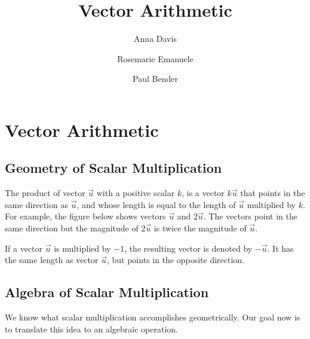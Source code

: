 \documentclass{ximera}
\author{Anna Davis \and Rosemarie Emanuele \and Paul Bender} \title{Vector Arithmetic} \license{CC-BY 4.0}
\begin{document}
\begin{abstract}
 
\end{abstract}
\maketitle

\section*{Vector Arithmetic}

\subsection*{Geometry of Scalar Multiplication} The product of vector $\vec{u}$ with a positive scalar $k$, is a vector $k\vec{u}$ that points in the same direction as $\vec{u}$, and whose length  is equal to the length of $\vec{u}$ multiplied by $k$. For example, the figure below shows vectors $\vec{u}$ and $2\vec{u}$.  The vectors point in the same direction but the magnitude of $2\vec{u}$ is twice the magnitude of $\vec{u}$.

\begin{center}
\end{center}


If a vector $\vec{u}$ is multiplied by $-1$, the resulting vector is denoted by $-\vec{u}$.  It has the same length as vector $\vec{u}$, but points in the opposite direction.

\begin{center}
\end{center}



\subsection*{Algebra of Scalar Multiplication}
We know what scalar multiplication accomplishes geometrically.  Our goal now is to translate this idea to an algebraic operation.  
\end{document}
